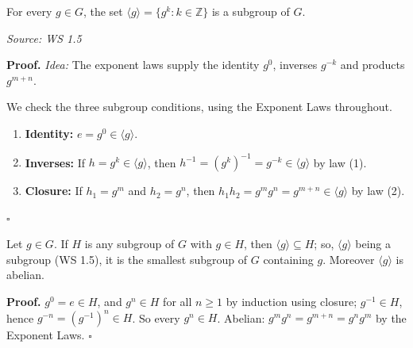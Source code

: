 \documentclass[11pt]{report}
\renewenvironment{proof}[1][Proof]{\noindent\textbf{#1.} }{\hfill$\square$\par\vspace{5pt}}
\newcommand{\srcline}[1]{\par\hfill{\footnotesize\textit{Source: #1}}}
\begin{document}
\begin{propbox}\label{prop:gen-g-subgroup}
For every $g \in G$, the set $\langle g \rangle = \{g^k : k \in \mathbb{Z}\}$ is a subgroup of $G$.
\srcline{WS 1.5}
\end{propbox}

\begin{proof}
\textit{Idea:} The exponent laws supply the identity $g^0$, inverses $g^{-k}$ and products $g^{m+n}$.\par
We check the three subgroup conditions, using the Exponent Laws throughout.
\begin{enumerate}
    \item \textbf{Identity:} $e = g^0 \in \langle g \rangle$.
    \item \textbf{Inverses:} If $h = g^k \in \langle g \rangle$, then $h^{-1} = (g^k)^{-1} = g^{-k} \in \langle g \rangle$ by law (1).
    \item \textbf{Closure:} If $h_1 = g^m$ and $h_2 = g^n$, then $h_1 h_2 = g^m g^n = g^{m+n} \in \langle g \rangle$ by law (2).
\end{enumerate}
\end{proof}

\begin{propbox}\label{prop:gen-g-smallest-subgroup-containing-g}
Let $g \in G$. If $H$ is any subgroup of $G$ with $g \in H$, then $\langle g \rangle \subseteq H$; so, $\langle g \rangle$ being a subgroup (WS 1.5), it is the smallest subgroup of $G$ containing $g$. Moreover $\langle g \rangle$ is abelian.
\end{propbox}

\begin{proof}
$g^0 = e \in H$, and $g^n \in H$ for all $n \geq 1$ by induction using closure; $g^{-1} \in H$, hence $g^{-n} = (g^{-1})^n \in H$. So every $g^n \in H$. Abelian: $g^m g^n = g^{m+n} = g^n g^m$ by the Exponent Laws.
\end{proof}
\end{document}
